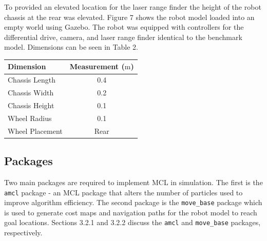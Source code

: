 \documentclass[a4paper]{article}
\begin{document}
\begin{minipage}{0.45\textwidth}
To provided an elevated location for the laser range finder the height of the robot chassis at the rear was elevated. Figure 7 shows the robot model loaded into an empty world using Gazebo. The robot was equipped with controllers for the differential drive, camera, and laser range finder identical to the benchmark model. Dimensions can be seen in Table 2.
\end{minipage}
\hspace{1cm}
\begin{minipage}{0.45\textwidth}
\centering
{}
\begin{tabular}{lc}
\toprule
\textbf{Dimension} & \textbf{Measurement ($\si{\meter}$)} \\
\midrule
Chassis Length & 0.4\\
Chassis Width & 0.2\\
Chassis Height & 0.1\\
Wheel Radius & 0.1\\
Wheel Placement & Rear\\
\bottomrule
\end{tabular}
\end{minipage}

\newpage

\subsection{Packages}
Two main packages are required to implement MCL in simulation. The first is the \texttt{amcl} package - an MCL package that alters the number of particles used to improve algorithm efficiency. The second package is the \texttt{move\_base} package which is used to generate cost maps and navigation paths for the robot model to reach goal locations. Sections 3.2.1 and 3.2.2 discuss the \texttt{amcl} and \texttt{move\_base} packages, respectively.
\end{document}
